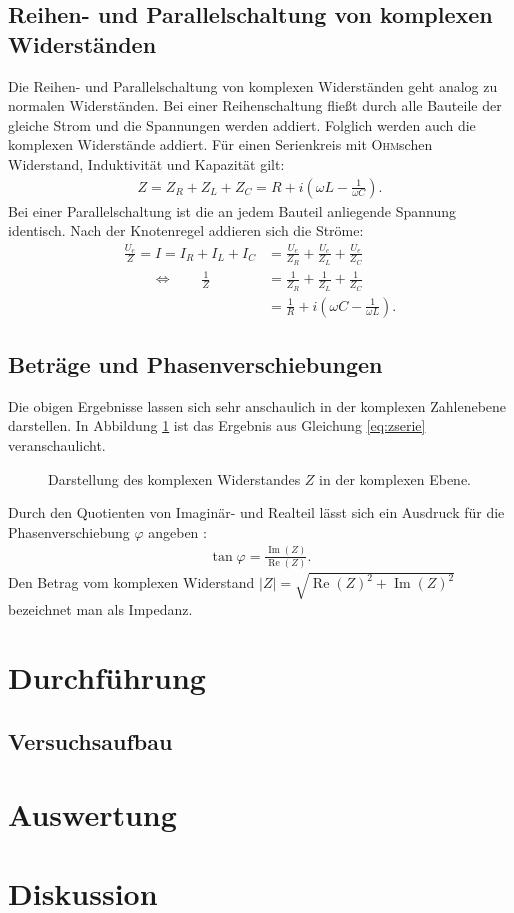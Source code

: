 \documentclass[12pt,a4paper,titlepage,headinclude]{scrartcl}
\newcommand{\aeqiv}{\ensuremath{\qquad \Longleftrightarrow \qquad}} %
\newcommand{\person}[1]{\textsc{#1}}
\begin{document}
\subsection{Reihen- und Parallelschaltung von komplexen Widerständen}
Die Reihen- und Parallelschaltung von komplexen Widerständen geht analog zu normalen Widerständen. Bei einer Reihenschaltung fließt durch alle Bauteile der gleiche Strom und die Spannungen werden addiert. Folglich werden auch die komplexen Widerstände addiert. Für einen Serienkreis mit \person{Ohm}schen Widerstand, Induktivität und Kapazität gilt:
\begin{align}
	Z=Z_R+Z_L+Z_C=R+i\left( \omega L-\frac{1}{\omega C} \right).
	\label{eq:zserie}
\end{align}
Bei einer Parallelschaltung ist die an jedem Bauteil anliegende Spannung identisch. Nach der Knotenregel \cite[55]{demtroeder2} addieren sich die Ströme:
\begin{align}
	\frac{U_e}{Z}=I=I_R+I_L+I_C&=\frac{U_e}{Z_R}+\frac{U_e}{Z_L}+\frac{U_e}{Z_C}\\
	\aeqiv \frac{1}{Z}&=\frac{1}{Z_R}+\frac{1}{Z_L}+\frac{1}{Z_C}\\
	&=\frac{1}{R}+i\left( \omega C- \frac{1}{\omega L}\right).
	\label{eq:zpara}
\end{align}
\subsection{Beträge und Phasenverschiebungen}
Die obigen Ergebnisse lassen sich sehr anschaulich in der komplexen Zahlenebene darstellen. In Abbildung \ref{fig:theozeiger} ist das Ergebnis aus Gleichung \eqref{eq:zserie} veranschaulicht. 
\begin{figure}[htb]
	\centering
	
	\caption{Darstellung des komplexen Widerstandes $Z$ in der komplexen Ebene.}
	\label{fig:theozeiger}
\end{figure}
Durch den Quotienten von Imaginär- und Realteil lässt sich ein Ausdruck für die Phasenverschiebung $\varphi$ angeben \cite[153]{demtroeder2}:
\begin{align}
	\tan\varphi=\frac{\operatorname{Im}(Z)}{\operatorname{Re}(Z)}.
	\label{eq:phase}
\end{align}
Den Betrag vom komplexen Widerstand $|Z|=\sqrt{\operatorname{Re}(Z)^2+\operatorname{Im}(Z)^2}$ bezeichnet man als Impedanz.
\section{Durchführung}
\label{sec:durchfuehrung}

\subsection{Versuchsaufbau}

\section{Auswertung}
\label{sec:auswertung}

\section{Diskussion}
\label{sec:diskussion}

\newpage
\printbibliography[heading=bibintoc]
\end{document}
